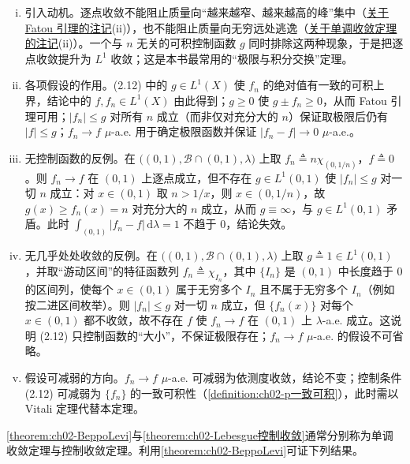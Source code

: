 \documentclass[../../main.tex]{subfiles}%
\begin{document}
\begin{remark}\label{remark:ch02-Lebesgue控制收敛动机}
\begin{enumerate}[(i)]
\item 引入动机。逐点收敛不能阻止质量向“越来越窄、越来越高的峰”集中（\hyperref[remark:ch02-Fatou动机]{关于 Fatou 引理的注记}(ii)），也不能阻止质量向无穷远处逃逸（\hyperref[remark:ch02-BeppoLevi动机]{关于单调收敛定理的注记}(ii)）。一个与 $n$ 无关的可积控制函数 $g$ 同时排除这两种现象，于是把逐点收敛提升为 $L^1$ 收敛；这是本书最常用的“极限与积分交换”定理。
\item 各项假设的作用。(2.12) 中的 $g\in L^1(X)$ 使 $f_n$ 的绝对值有一致的可积上界，结论中的 $f,f_n\in L^1(X)$ 由此得到；$g\geqslant0$ 使 $g\pm f_n\geqslant0$，从而 Fatou 引理可用；$|f_n|\leqslant g$ 对所有 $n$ 成立（而非仅对充分大的 $n$）保证取极限后仍有 $|f|\leqslant g$；$f_n\to f$ $\mu$-a.e. 用于确定极限函数并保证 $|f_n-f|\to0$ $\mu$-a.e.。
\item 无控制函数的反例。在 $\big((0,1),\mathscr B\cap(0,1),\lambda\big)$ 上取 $f_n\triangleq n\chi_{(0,1/n)}$，$f\triangleq0$。则 $f_n\to f$ 在 $(0,1)$ 上逐点成立，但不存在 $g\in L^1(0,1)$ 使 $|f_n|\leqslant g$ 对一切 $n$ 成立：对 $x\in(0,1)$ 取 $n>1/x$，则 $x\in(0,1/n)$，故 $g(x)\geqslant f_n(x)=n$ 对充分大的 $n$ 成立，从而 $g\equiv\infty$，与 $g\in L^1(0,1)$ 矛盾。此时 $\int_{(0,1)}|f_n-f|\,\mathrm{d}\lambda=1$ 不趋于 $0$，结论失效。
\item 无几乎处处收敛的反例。在 $\big((0,1),\mathscr B\cap(0,1),\lambda\big)$ 上取 $g\triangleq1\in L^1(0,1)$，并取“游动区间”的特征函数列 $f_n\triangleq\chi_{I_n}$，其中 $\{I_n\}$ 是 $(0,1)$ 中长度趋于 $0$ 的区间列，使每个 $x\in(0,1)$ 属于无穷多个 $I_n$ 且不属于无穷多个 $I_n$（例如按二进区间枚举）。则 $|f_n|\leqslant g$ 对一切 $n$ 成立，但 $\{f_n(x)\}$ 对每个 $x\in(0,1)$ 都不收敛，故不存在 $f$ 使 $f_n\to f$ 在 $(0,1)$ 上 $\lambda$-a.e. 成立。这说明 (2.12) 只控制函数的“大小”，不保证极限存在；$f_n\to f$ $\mu$-a.e. 的假设不可省略。
\item 假设可减弱的方向。$f_n\to f$ $\mu$-a.e. 可减弱为依测度收敛，结论不变；控制条件 (2.12) 可减弱为 $\{f_n\}$ 的一致可积性（\cref{definition:ch02-p一致可积}），此时需以 Vitali 定理代替本定理。
\end{enumerate}
\end{remark}

\cref{theorem:ch02-BeppoLevi}与\cref{theorem:ch02-Lebesgue控制收敛}通常分别称为单调收敛定理与控制收敛定理。利用\cref{theorem:ch02-BeppoLevi}可证下列结果。
\end{document}
